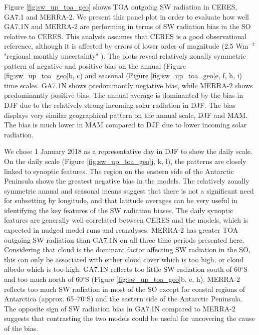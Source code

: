 Figure \ref{fig:sw_up_toa_geo} shows TOA outgoing SW radiation in CERES, GA7.1
and MERRA-2. We present this panel plot in order to evaluate how well GA7.1N and
MERRA-2 are performing in terms of SW radiation bias in the SO relative to
CERES. This analysis assumes that CERES is a good observational reference,
although it is affected by errors of lower order of magnitude (2.5 Wm$^{-2}$
"regional monthly uncertainty" \citep[sec. 4a.]{loeb2018}). The plots reveal
relatively zonally symmetric pattern of negative and positive bias on the
annual (Figure \ref{fig:sw_up_toa_geo}b, c) and seasonal (Figure
\ref{fig:sw_up_toa_geo}e, f, h, i) time scales. GA7.1N shows predominantly
negiative bias, while MERRA-2 shows predominantly positive bias. The annual
average is dominanted by the bias in DJF due to the relatively strong incoming
solar radiation in DJF. The bias displays very similar geographical pattern on
the annual scale, DJF and MAM. The bias is much lower in MAM compared to DJF
due to lower incoming solar radiation.

We chose 1 January 2018 as a representative day in DJF to show the daily scale.
On the daily scale (Figure \ref{fig:sw_up_toa_geo}j, k, l), the patterns are
closely linked to synoptic features. The region on the eastern side of the
Antarctic Peninsula shows the greatest negative bias in the models. The
relatively zonally symmetric annual and seasonal means suggest that there is
not a significant need for subsetting by longitude, and that latitude averages
can be very useful in identifying the key features of the SW radiation biases.
The daily synoptic features are generally well-correlated between CERES and the
models, which is expected in nudged model runs and reanalyses. MERRA-2 has
greater TOA outgoing SW radiation than GA7.1N on all three time periods
presented here. Considering that cloud is the dominant factor affecting SW
radiation in the SO, this can only be associated with either cloud cover which
is too high, or cloud albedo which is too high. GA7.1N reflects too little SW
radiation south of 60$^\circ$S and too much north of 60$^\circ$S (Figure
\ref{fig:sw_up_toa_geo}b, e, h). MERRA-2 reflects too much SW radiation in most
of the SO except for coastal regions of Antarctica (approx. 65--70$^\circ$S)
and the eastern side of the Antarctic Peninsula. The opposite sign of SW
radiation bias in GA7.1N compared to MERRA-2 suggests that contrasting the two
models could be useful for uncovering the cause of the bias.

